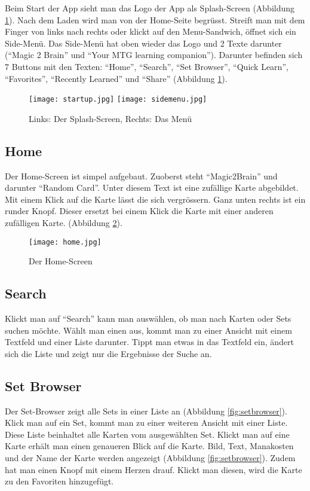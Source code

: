 Beim Start der App sieht man das Logo der App als Splash-Screen (Abbildung \ref{fig:splashundmenu}). Nach dem Laden wird man von der Home-Seite begrüsst. Streift man mit dem Finger von links nach rechts oder klickt auf den Menu-Sandwich, öffnet sich ein Side-Menü. Das Side-Menü hat oben wieder das Logo und 2 Texte darunter ("`Magic 2 Brain"' und "`Your MTG learning companion"'). Darunter befinden sich 7 Buttons mit den Texten: "`Home"', "`Search"', "`Set Browser"', "`Quick Learn"', "`Favorites"', "`Recently Learned"' und "`Share"' (Abbildung \ref{fig:splashundmenu}).

\begin{figure}[htbp] 
  \centering
     \texttt{[image: startup.jpg]}
     \texttt{[image: sidemenu.jpg]}
  \caption{Links: Der Splash-Screen, Rechts: Das Menü}
  \label{fig:splashundmenu}
\end{figure}

\subsection{Home}
Der Home-Screen ist simpel aufgebaut. Zuoberst steht "`Magic2Brain"' und darunter "`Random Card"'. Unter diesem Text ist eine zufällige Karte abgebildet. Mit einem Klick auf die Karte lässt die sich vergrössern. Ganz unten rechts ist ein runder Knopf. Dieser ersetzt bei einem Klick die Karte mit einer anderen zufälligen Karte. (Abbildung \ref{fig:homemenu}).

\begin{figure}[htbp] 
  \centering
     \texttt{[image: home.jpg]}
  \caption{Der Home-Screen}
  \label{fig:homemenu}
\end{figure}

\subsection{Search}
Klickt man auf "`Search"' kann man auswählen, ob man nach Karten oder Sets suchen möchte. Wählt man einen aus, kommt man zu einer Ansicht mit einem Textfeld und einer Liste darunter. Tippt man etwas in das Textfeld ein, ändert sich die Liste und zeigt nur die Ergebnisse der Suche an.

\subsection{Set Browser}
Der Set-Browser zeigt alle Sets in einer Liste an (Abbildung \ref{fig:setbrowser}). Klick man auf ein Set, kommt man zu einer weiteren Ansicht mit einer Liste. Diese Liste beinhaltet alle Karten vom ausgewählten Set. Klickt man auf eine Karte erhält man einen genaueren Blick auf die Karte. Bild, Text, Manakosten und der Name der Karte werden angezeigt (Abbildung \ref{fig:setbrowser}). Zudem hat man einen Knopf mit einem Herzen drauf. Klickt man diesen, wird die Karte zu den Favoriten hinzugefügt.

